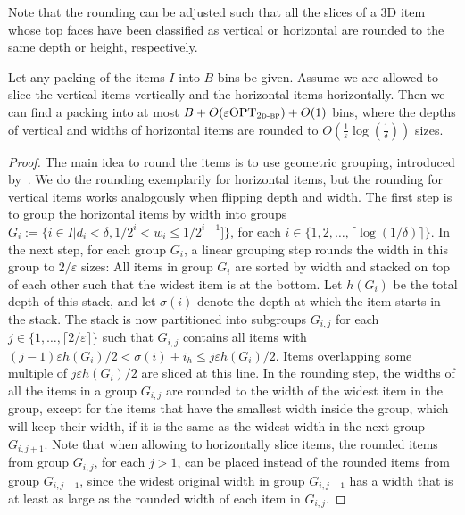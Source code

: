 \documentclass[a4paper,UKenglish,cleveref, autoref, thm-restate]{lipics-v2021}
\newcommand{\eps}{\varepsilon}
\newcommand{\opt}{\mathrm{OPT}}
\newcommand{\twobp}{\textsc{2d-bp}\xspace}
\begin{document}
Note that the rounding can be adjusted such that all the slices of a 3D item whose top faces have been classified as vertical or horizontal are rounded to the same depth or height, respectively.

\begin{lemma}
\label{lem:rounding-vert-hor-items-2bp}
Let any packing of the items $I$ into $B$ bins be given.
Assume we are allowed to slice the vertical items vertically and the horizontal items horizontally.
Then we can find a packing into at most $B + O(\eps \opt_{\twobp}) +O(1)$ bins, where the depths of vertical and widths of horizontal items are rounded to $O(\frac{1}{\eps}\log(\frac{1}{\delta}))$ sizes.
\end{lemma}
\begin{proof}
The main idea to round the items is to use geometric grouping, introduced by~\cite{VegaL81}.
We do the rounding exemplarily for horizontal items, but the rounding for vertical items works analogously when flipping depth and width.
The first step is to group the horizontal items by width into groups $G_i := \{i \in I| d_i< \delta, 1/2^i < w_i \leq 1/2^{i-1}] \}$, 
for each $i \in \{1,2,\dots,\lceil \log(1/\delta) \rceil\}$. In the next step, for each group $G_i$, a linear grouping step rounds the width in this group to $2/\eps$ sizes:
All items in group $G_i$ are sorted by width and stacked on top of each other such that the widest item is at the bottom. Let $h(G_i)$ be the total depth of this stack, and let $\sigma(i)$ denote the depth at which the item starts in the stack.
The stack is now partitioned into subgroups $G_{i,j}$ for each $j \in\{1,\dots, \lceil2/\eps\rceil\}$ such that $G_{i,j}$ contains all items with $(j-1)\eps h(G_i)/2 < \sigma(i) +i_h \leq j\eps h(G_i)/2$.
Items overlapping some multiple of $j\eps h(G_i)/2$ are sliced at this line.
In the rounding step, the widths of all the items in a group $G_{i,j}$ are rounded to the width of the widest item in the group, except for the items that have the smallest width inside the group, 
which will keep their width, if it is the same as the widest width in the next group $G_{i,j+1}$. 
Note that when allowing to horizontally slice items, the rounded items from group $G_{i,j}$, for each $j> 1$, can be placed instead of the rounded items from group $G_{i,j-1}$, since the widest original width in group $G_{i,j-1}$ has a width that is at least as large as the rounded width of each item in $G_{i,j}$.


\end{proof}
\end{document}

